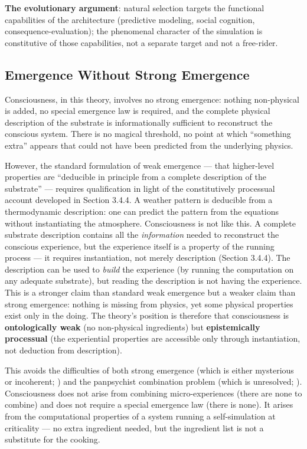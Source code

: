 \documentclass[12pt]{article}
\begin{document}
\textbf{The evolutionary argument}: natural selection targets the functional capabilities of the architecture (predictive modeling, social cognition, consequence-evaluation); the phenomenal character of the simulation is constitutive of those capabilities, not a separate target and not a free-rider.


\subsection{Emergence Without Strong Emergence}


Consciousness, in this theory, involves no strong emergence: nothing non-physical is added, no special emergence law is required, and the complete physical description of the substrate is informationally sufficient to reconstruct the conscious system. There is no magical threshold, no point at which ``something extra'' appears that could not have been predicted from the underlying physics.

However, the standard formulation of weak emergence --- that higher-level properties are ``deducible in principle from a complete description of the substrate'' --- requires qualification in light of the constitutively processual account developed in Section 3.4.4. A weather pattern is deducible from a thermodynamic description: one can predict the pattern from the equations without instantiating the atmosphere. Consciousness is not like this. A complete substrate description contains all the \emph{information} needed to reconstruct the conscious experience, but the experience itself is a property of the running process --- it requires instantiation, not merely description (Section 3.4.4). The description can be used to \emph{build} the experience (by running the computation on any adequate substrate), but reading the description is not having the experience. This is a stronger claim than standard weak emergence but a weaker claim than strong emergence: nothing is missing from physics, yet some physical properties exist only in the doing. The theory's position is therefore that consciousness is \textbf{ontologically weak} (no non-physical ingredients) but \textbf{epistemically processual} (the experiential properties are accessible only through instantiation, not deduction from description).

This avoids the difficulties of both strong emergence (which is either mysterious or incoherent; \citealp{Kim1993}) and the panpsychist combination problem (which is unresolved; \citealp{Chalmers2016}). Consciousness does not arise from combining micro-experiences (there are none to combine) and does not require a special emergence law (there is none). It arises from the computational properties of a system running a self-simulation at criticality --- no extra ingredient needed, but the ingredient list is not a substitute for the cooking.
\end{document}
